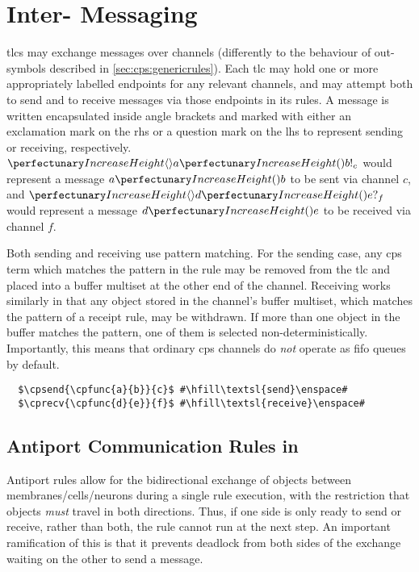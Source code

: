 \section{\label{sec:cps:intertlcmess}Inter- Messaging}

\Glspl{tlc} may exchange messages over channels (differently to the behaviour of out-symbols described in \cref{sec:cps:genericrules}).  Each \gls{tlc} may hold one or more appropriately labelled endpoints for any relevant channels, and may attempt both to send and to receive messages via those endpoints in its rules.  A message is written encapsulated inside angle brackets and marked with either an exclamation mark on the \gls{rhs} or a question mark on the \gls{lhs} to represent sending or receiving, respectively.  \Eg{} \(\cpsend{\cpfunc{a}{b}}{c}\) would represent a message \(\cpfunc{a}{b}\) to be sent via channel \(c\), and \(\cprecv{\cpfunc{d}{e}}{f}\) would represent a message \(\cpfunc{d}{e}\) to be received via channel \(f\).

Both sending and receiving use pattern matching.  For the sending case, any \gls{cps} term which matches the pattern in the rule may be removed from the \gls{tlc} and placed into a buffer multiset at the other end of the channel.  Receiving works similarly in that any object stored in the channel's buffer multiset, which matches the pattern of a receipt rule, may be withdrawn.  If more than one object in the buffer matches the pattern, one of them is selected non-deterministically.  Importantly, this means that ordinary \gls{cps} channels do \emph{not} operate as \gls{fifo} queues by default.

\lstset{xleftmargin=.5in, xrightmargin=.5in} 
\begin{lstlisting}
  $\cpsend{\cpfunc{a}{b}}{c}$ #\hfill\textsl{send}\enspace#
  $\cprecv{\cpfunc{d}{e}}{f}$ #\hfill\textsl{receive}\enspace#
\end{lstlisting}

\subsection{\label{sec:cps:antiport}Antiport Communication Rules in }

Antiport rules \cite{Orellana-Martin2019,Paun2002} allow for the bidirectional exchange of objects between membranes/cells/neurons during a single rule execution, with the restriction that objects \emph{must} travel in both directions.  Thus, if one side is only ready to send or receive, rather than both, the rule cannot run at the next step.  An important ramification of this is that it prevents deadlock from both sides of the exchange waiting on the other to send a message.


